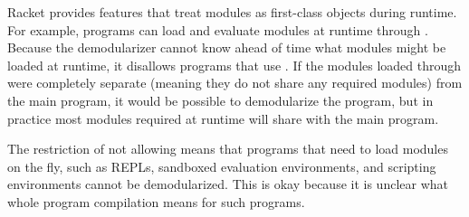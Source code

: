 Racket provides features that treat modules as first-class objects during runtime. 
For example, programs can load and evaluate modules at runtime through . 
Because the demodularizer cannot know ahead of time what modules might be loaded at runtime, it disallows programs that use .
If the modules loaded through  were completely separate (meaning they do not share any required modules) from the main program, it would be possible to demodularize the program, but in practice most modules required at runtime will share with the main program.

The restriction of not allowing  means that programs that need to load modules on the fly, such as REPLs, sandboxed evaluation environments, and scripting environments cannot be demodularized.
This is okay because it is unclear what whole program compilation means for such programs.

